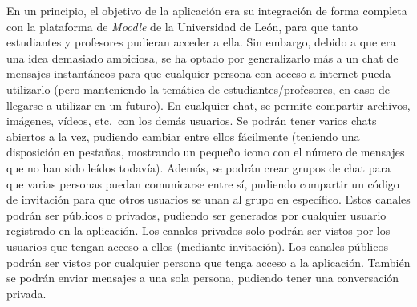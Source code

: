 En un principio, el objetivo de la aplicación era su integración de forma completa con la plataforma de
\textit{Moodle} de la Universidad de León, para que tanto estudiantes y profesores pudieran acceder a ella.
Sin embargo, debido a que era una idea demasiado ambiciosa, se ha optado por generalizarlo más a un chat de
mensajes instantáneos para que cualquier persona con acceso a internet pueda utilizarlo (pero manteniendo la temática
de estudiantes/profesores, en caso de llegarse a utilizar en un futuro).
En cualquier chat, se permite compartir archivos, imágenes, vídeos, etc.\ con los demás usuarios.
Se podrán tener varios chats abiertos a la vez, pudiendo cambiar entre ellos fácilmente (teniendo una disposición en
pestañas, mostrando un pequeño icono con el número de mensajes que no han sido leídos todavía).
Además, se podrán crear grupos de chat para que varias personas puedan
comunicarse entre sí, pudiendo compartir un código de invitación para que otros usuarios se unan al grupo en específico.
Estos canales podrán ser públicos o privados, pudiendo ser generados por cualquier usuario registrado en la
aplicación.
Los canales privados solo podrán ser vistos por los usuarios que tengan acceso a ellos (mediante invitación).
Los canales públicos podrán ser vistos por cualquier persona que tenga acceso a la aplicación.
También se podrán enviar mensajes a una sola persona, pudiendo tener una conversación privada.
